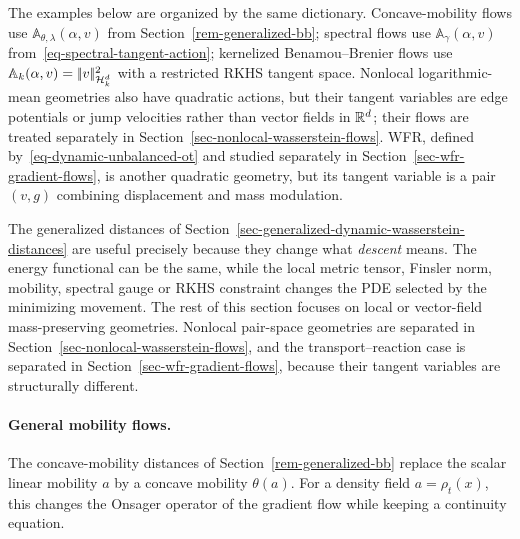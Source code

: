 The examples below are organized by the same dictionary. Concave-mobility flows use $\mathbb A_{\theta,\lambda}(\alpha,v)$ from Section~\ref{rem-generalized-bb}; spectral flows use $\mathbb A_\gamma(\alpha,v)$ from~\eqref{eq-spectral-tangent-action}; kernelized Benamou--Brenier flows use $\mathbb A_k(\alpha,v)=|\!| v |\!|_{\mathcal{H}_k^d}^2$ with a restricted RKHS tangent space. Nonlocal logarithmic-mean geometries also have quadratic actions, but their tangent variables are edge potentials or jump velocities rather than vector fields in $\mathbb{R}^d$; their flows are treated separately in Section~\ref{sec-nonlocal-wasserstein-flows}. WFR, defined by~\eqref{eq-dynamic-unbalanced-ot} and studied separately in Section~\ref{sec-wfr-gradient-flows}, is another quadratic geometry, but its tangent variable is a pair $(v,g)$ combining displacement and mass modulation.

The generalized distances of Section~\ref{sec-generalized-dynamic-wasserstein-distances} are useful precisely because they change what \emph{descent} means. The energy functional can be the same, while the local metric tensor, Finsler norm, mobility, spectral gauge or RKHS constraint changes the PDE selected by the minimizing movement. The rest of this section focuses on local or vector-field mass-preserving geometries. Nonlocal pair-space geometries are separated in Section~\ref{sec-nonlocal-wasserstein-flows}, and the transport--reaction case is separated in Section~\ref{sec-wfr-gradient-flows}, because their tangent variables are structurally different.

\paragraph{General mobility flows.}
The concave-mobility distances of Section~\ref{rem-generalized-bb} replace the scalar linear mobility \(a\) by a concave mobility \(\theta(a)\). For a density field \(a=\rho_t(x)\), this changes the Onsager operator of the gradient flow while keeping a continuity equation.

